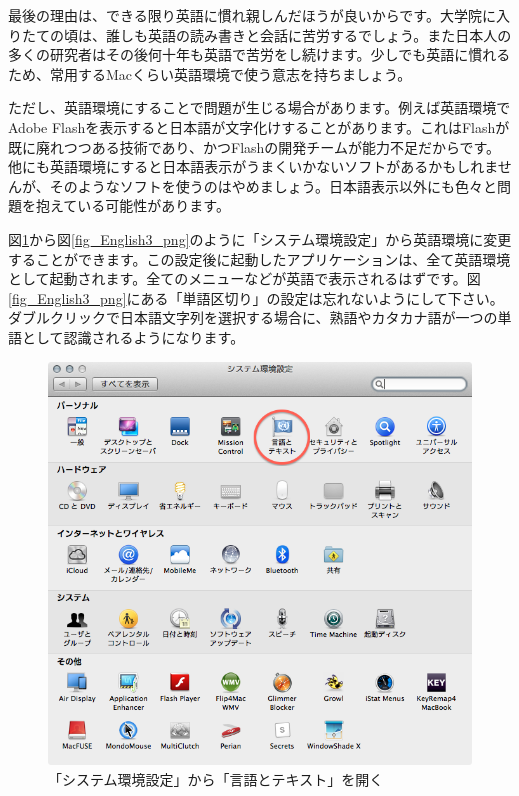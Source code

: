 最後の理由は、できる限り英語に慣れ親しんだほうが良いからです。大学院に入りたての頃は、誰しも英語の読み書きと会話に苦労するでしょう。また日本人の多くの研究者はその後何十年も英語で苦労をし続けます。少しでも英語に慣れるため、常用するMacくらい英語環境で使う意志を持ちましょう。

ただし、英語環境にすることで問題が生じる場合があります。例えば英語環境でAdobe Flashを表示すると日本語が文字化けすることがあります。これはFlashが既に廃れつつある技術であり、かつFlashの開発チームが能力不足だからです。他にも英語環境にすると日本語表示がうまくいかないソフトがあるかもしれませんが、そのようなソフトを使うのはやめましょう。日本語表示以外にも色々と問題を抱えている可能性があります。

図\ref{fig_English1_png}から図\ref{fig_English3_png}のように「システム環境設定」から英語環境に変更することができます。この設定後に起動したアプリケーションは、全て英語環境として起動されます。全てのメニューなどが英語で表示されるはずです。図\ref{fig_English3_png}にある「単語区切り」の設定は忘れないようにして下さい。ダブルクリックで日本語文字列を選択する場合に、熟語やカタカナ語が一つの単語として認識されるようになります。

\begin{figure}
  \centering
  \includegraphics[scale=0.35]{fig/English1.png}
  \caption{「システム環境設定」から「言語とテキスト」を開く}
  \label{fig_English1_png}
\end{figure}

